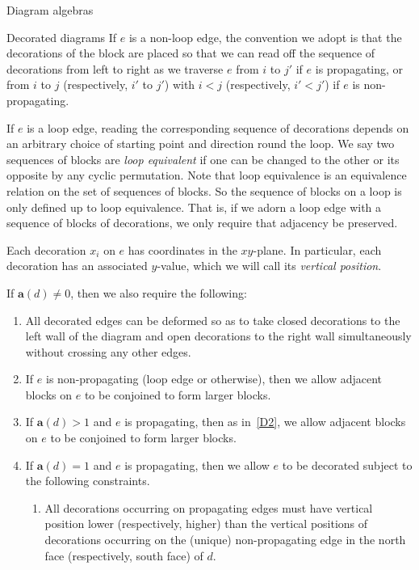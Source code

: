 \documentclass[11pt]{amsart}
\theoremstyle{definition}
\numberwithin{equation}{section}
\renewcommand{\a}{\mathbf{a}}
\renewcommand{\(}{\left(}
\renewcommand{\)}{\right)}
\begin{document}
\begin{section}{Diagram algebras}
\begin{subsection}{Decorated diagrams}
If $e$ is a non-loop edge, the convention we adopt is that the decorations of the block are placed so that we can read off the sequence of decorations from left to right as we traverse $e$ from $i$ to $j'$ if $e$ is propagating, or from $i$ to $j$ (respectively, $i'$ to $j'$) with $i < j$ (respectively, $i' < j'$) if $e$ is non-propagating.

If $e$ is a loop edge, reading the corresponding sequence of decorations depends on an arbitrary choice of starting point and direction round the loop. We say two sequences of blocks are \emph{loop equivalent} if one can be changed to the other or its opposite by any cyclic permutation. Note that loop equivalence is an equivalence relation on the set of sequences of blocks.  So the sequence of blocks on a loop is only defined up to loop equivalence.  That is, if we adorn a loop edge with a sequence of blocks of decorations, we only require that adjacency be preserved.

Each decoration $x_{i}$ on $e$  has coordinates in the $xy$-plane.  In particular, each decoration has an associated $y$-value, which we will call its \emph{vertical position}.  

If $\a(d)\neq 0$, then we also require the following:

\begin{enumerate}[label=\rm{(D\arabic*)}]

\item \label{D1} All decorated edges can be deformed so as to take closed decorations to the left wall of the diagram and open decorations to the right wall simultaneously without crossing any other edges.

\item \label{D2} If $e$ is non-propagating (loop edge or otherwise), then we allow adjacent blocks on $e$ to be conjoined to form larger blocks.

\item \label{D3} If $\a(d)>1$ and $e$ is propagating, then as in~\ref{D2}, we allow adjacent blocks on $e$ to be conjoined to form larger blocks.

\item \label{unusual} If $\a(d)=1$ and $e$ is propagating, then we allow $e$ to be decorated subject to the following constraints.

\begin{enumerate}
\item All decorations occurring on propagating edges must have vertical position lower (respectively, higher) than the vertical positions of decorations occurring on the (unique) non-propagating edge in the north face (respectively, south face) of $d$.


\end{enumerate}
\end{enumerate}
\end{subsection}
\end{section}
\end{document}
